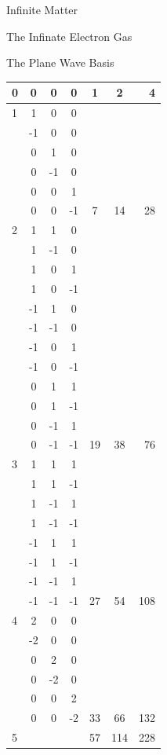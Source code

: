 \documentclass[twoside,english]{uiofysmaster}
\begin{document}
\begin{chapter}{Infinite Matter}
\begin{section}{The Infinate Electron Gas}
\begin{subsection}{The Plane Wave Basis}
\begin{table}[H]
\begin{center}
\begin{tabular}[center]{l | c c c | c | c | r }
						0 & 0 & 0 & 0 & 1 & 2 & 4 \\
						\hline
						1 & 1 & 0 & 0 &   &   &   \\
						  & -1& 0 & 0 &   &   &   \\
						  & 0 & 1 & 0 &   &   &   \\
						  & 0 & -1& 0 &   &   &   \\
						  & 0 & 0 & 1 &   &   &   \\
						  & 0 & 0 & -1& 7 & 14& 28\\
						\hline
						2 & 1 & 1 & 0 &   &   &   \\
						  & 1 & -1& 0 &   &   &   \\
						  & 1 & 0 & 1 &   &   &   \\
						  & 1 & 0 & -1&   &   &   \\
						  & -1& 1 & 0 &   &   &   \\
						  & -1& -1& 0 &   &   &   \\
						  & -1& 0 & 1 &   &   &   \\
						  & -1& 0 & -1&   &   &   \\
						  & 0 & 1 & 1 &   &   &   \\
						  & 0 & 1 & -1&   &   &   \\
						  & 0 & -1& 1 &   &   &   \\
						  & 0 & -1& -1&19 &38 & 76\\
						\hline
						3 & 1 & 1 & 1 &   &   &   \\
						  & 1 & 1 & -1&   &   &   \\
						  & 1 & -1& 1 &   &   &   \\
						  & 1 & -1& -1&   &   &   \\
						  & -1& 1 & 1 &   &   &   \\
						  & -1& 1 & -1&   &   &   \\
						  & -1& -1& 1 &   &   &   \\
						  & -1& -1& -1&27 & 54&108\\
						\hline
						4 & 2 & 0 & 0 &   &   &   \\
						  & -2& 0 & 0 &   &   &   \\
						  & 0 & 2 & 0 &   &   &   \\
						  & 0 & -2& 0 &   &   &   \\
						  & 0 & 0 & 2 &   &   &   \\
						  & 0 & 0 & -2& 33& 66&132\\
						\hline
						5 &   &   &   & 57&114&228\\

\end{tabular}
\end{center}
\end{table}
\end{subsection}
\end{section}
\end{chapter}
\end{document}
